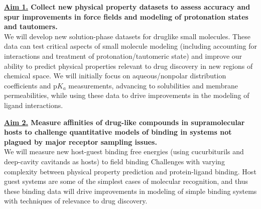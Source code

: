 \documentclass[11pt]{article}
\begin{document}

{\bf \underline{Aim 1.} Collect new physical property datasets to assess accuracy and spur improvements in force fields and modeling of protonation states and tautomers.}\\
We will develop new solution-phase datasets for druglike small molecules. 
These data can test critical aspects of small molecule modeling (including accounting for interactions and treatment of protonation/tautomeric state) and improve our ability to predict physical properties relevant to drug discovery in new regions of chemical space. 
We will initially focus on aqueous/nonpolar distribution coefficients and p$K_a$ measurements, advancing to solubilities and membrane permeabilities, while using these data to drive improvements in the modeling of ligand interactions.


{\bf \underline{Aim 2.} Measure affinities of drug-like compounds in supramolecular hosts to challenge quantitative models of binding in systems not plagued by major receptor sampling issues.}\\
We will measure new host-guest binding free energies (using cucurbiturils and deep-cavity cavitands as hosts) to field binding Challenges with varying complexity between physical property prediction and protein-ligand binding. 
Host guest systems are some of the simplest cases of molecular recognition, and thus these binding data will drive improvements in modeling of simple binding systems with techniques of relevance to drug discovery.
\end{document}
